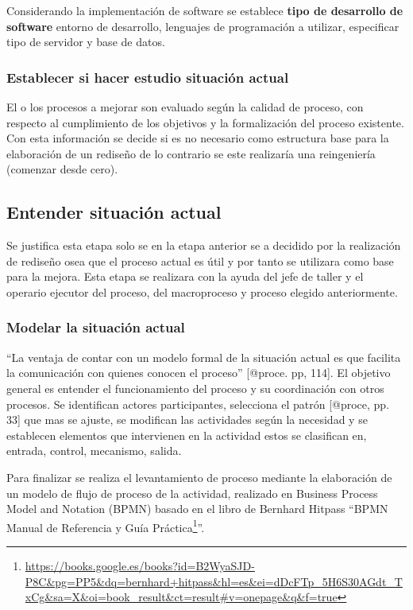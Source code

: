 \documentclass[
]{article}
\begin{document}
Considerando la implementación de software se establece \textbf{tipo de
desarrollo de software} entorno de desarrollo, lenguajes de programación
a utilizar, especificar tipo de servidor y base de datos.

\hypertarget{establecer-si-hacer-estudio-situaciuxf3n-actual}{%
\subsubsection{Establecer si hacer estudio situación
actual}\label{establecer-si-hacer-estudio-situaciuxf3n-actual}}

El o los procesos a mejorar son evaluado según la calidad de proceso,
con respecto al cumplimiento de los objetivos y la formalización del
proceso existente. Con esta información se decide si es no necesario
como estructura base para la elaboración de un rediseño de lo contrario
se este realizaría una reingeniería (comenzar desde cero).

\hypertarget{entender-situaciuxf3n-actual}{%
\subsection{Entender situación
actual}\label{entender-situaciuxf3n-actual}}

Se justifica esta etapa solo se en la etapa anterior se a decidido por
la realización de rediseño osea que el proceso actual es útil y por
tanto se utilizara como base para la mejora. Esta etapa se realizara con
la ayuda del jefe de taller y el operario ejecutor del proceso, del
macroproceso y proceso elegido anteriormente.

\hypertarget{modelar-la-situaciuxf3n-actual}{%
\subsubsection{Modelar la situación
actual}\label{modelar-la-situaciuxf3n-actual}}

``La ventaja de contar con un modelo formal de la situación actual es
que facilita la comunicación con quienes conocen el proceso'' {[}@proce.
pp, 114{]}. El objetivo general es entender el funcionamiento del
proceso y su coordinación con otros procesos. Se identifican actores
participantes, selecciona el patrón {[}@proce, pp. 33{]} que mas se
ajuste, se modifican las actividades según la necesidad y se establecen
elementos que intervienen en la actividad estos se clasifican en,
entrada, control, mecanismo, salida.

Para finalizar se realiza el levantamiento de proceso mediante la
elaboración de un modelo de flujo de proceso de la actividad, realizado
en Business Process Model and Notation (BPMN) basado en el libro de
Bernhard Hitpass ``BPMN Manual de Referencia y Guía
Práctica\footnote{\url{https://books.google.es/books?id=B2WyaSJD-P8C\&pg=PP5\&dq=bernhard+hitpass\&hl=es\&ei=dDcFTp_5H6S30AGdt_TxCg\&sa=X\&oi=book_result\&ct=result\#v=onepage\&q\&f=true}}''.
\end{document}
